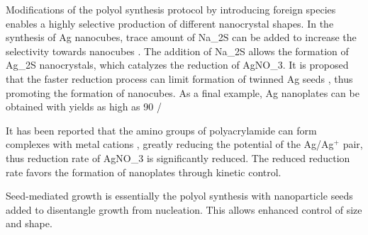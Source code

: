 Modifications of the polyol synthesis protocol by introducing foreign species enables a highly selective production of different nanocrystal shapes.
In the synthesis of Ag nanocubes, trace amount of Na_2S can be added to increase the selectivity towards nanocubes \cite{Skrabalak_2007,Siekkinen_2006}.
The addition of Na_2S allows the formation of Ag_2S nanocrystals, which catalyzes the reduction of AgNO_3.
It is proposed that the faster reduction process can limit formation of twinned Ag seeds \cite{Wiley_2006}, thus promoting the formation of nanocubes.
As a final example, Ag nanoplates can be obtained with yields as high as 90 /%

It has been reported that the amino groups of polyacrylamide can form complexes with metal cations \cite{Sari_2006}, greatly reducing the potential of the Ag/Ag$^+$ pair, thus reduction rate of AgNO_3 is significantly reduced.
The reduced reduction rate favors the formation of nanoplates through kinetic control.

Seed-mediated growth is essentially the polyol synthesis with nanoparticle seeds added to disentangle growth from nucleation.
This allows enhanced control of size and shape.
  
  
  
  
  
  
  
  
  
  
  
  
  